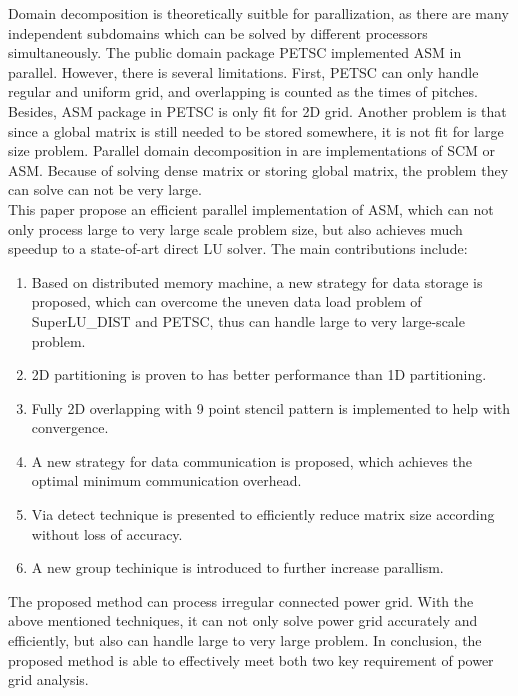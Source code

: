 \documentclass{sig-alternate}
\begin{document}
	Domain decomposition is theoretically suitble for parallization, as there are many independent subdomains which can be
	solved by different processors simultaneously. The public domain package PETSC\cite{PETSC_website} implemented ASM in parallel.
	However, there is several limitations. First, PETSC can only handle regular and uniform grid, and overlapping is counted as the
	times of pitches. Besides, ASM package in PETSC is only fit for 2D grid. Another problem is that since a global matrix is still
	needed to be stored somewhere, it is not fit for large size problem. Parallel domain decomposition in \cite{kaisun}\cite{voronov} 
	are implementations of SCM or ASM. Because of solving dense matrix or storing global matrix, the problem they can solve can not 
	be very large.\\

	This paper propose an efficient parallel implementation of ASM, which can not only process large to very large scale problem size, 
	but also achieves much speedup to a state-of-art direct LU solver. The main contributions include:\\
	\begin{enumerate}[1)]
	\item Based on distributed memory machine, a new strategy for data storage is proposed, which can overcome the uneven data 
	load problem of SuperLU\_DIST and PETSC, thus can handle large to very large-scale problem.
	\item 2D partitioning is proven to has better performance than 1D partitioning. 
	\item Fully 2D overlapping with 9 point stencil pattern is implemented to help with convergence. 
	\item A new strategy for data communication is proposed, which achieves the optimal minimum communication overhead.
	\item Via detect technique is presented to efficiently reduce matrix size according without loss of accuracy.
	\item A new group techinique is introduced to further increase parallism.\\
	\end{enumerate}

	The proposed method can process irregular connected power grid. With the above mentioned techniques, it can not only solve 
	power grid accurately and efficiently, but also can handle large to very large problem. In conclusion, the proposed method 
	is able to effectively meet both two key requirement of power grid analysis.\\
\end{document}
